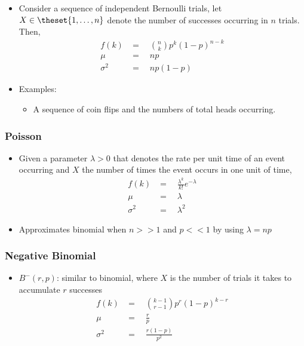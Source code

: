 \begin{itemize}
\tightlist
\item
  Consider a sequence of independent Bernoulli trials, let
  \(X \in \theset{1,\ldots, n}\) denote the number of successes
  occurring in \(n\) trials. Then,
  \begin{align*}
  f(k)            &= \quad {n \choose k} p^k (1-p)^{n-k} \\
  \mu             &= \quad np \\
  \sigma^2    &= \quad np(1-p)
  \end{align*}
\item
  Examples:

  \begin{itemize}
  \tightlist
  \item
    A sequence of coin flips and the numbers of total heads occurring.
  \end{itemize}
\end{itemize}

\hypertarget{poisson}{%
\subsubsection{Poisson}\label{poisson}}

\begin{itemize}
\tightlist
\item
  Given a parameter \(\lambda > 0\) that denotes the rate per unit time
  of an event occurring and \(X\) the number of times the event occurs
  in one unit of time,
  \begin{align*}
  f(k)            &= \quad \frac{\lambda^k}{k!}e^{-\lambda} \\
  \mu             &= \quad \lambda \\
  \sigma^2    &= \quad \lambda^2
  \end{align*}
\item
  Approximates binomial when \(n >> 1\) and \(p << 1\) by using
  \(\lambda = np\)
\end{itemize}

\hypertarget{negative-binomial}{%
\subsubsection{Negative Binomial}\label{negative-binomial}}

\begin{itemize}
\tightlist
\item
  \(B^- (r, p)\): similar to binomial, where \(X\) is the number of
  trials it takes to accumulate \(r\) successes
  \begin{align*}
  f(k) &= \quad {k-1 \choose r-1}p^r(1-p)^{k-r} \\
  \mu &= \quad \frac r p \\
  \sigma^2 &= \quad \frac{r (1-p)}{p^2}
  \end{align*}
\end{itemize}

